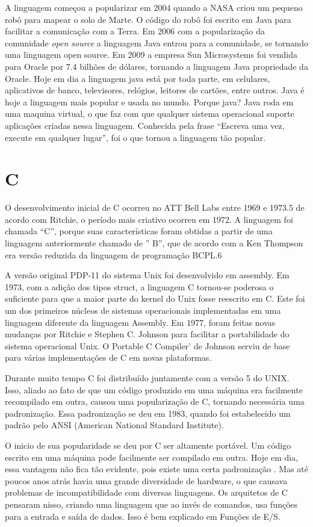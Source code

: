 \documentclass[
    12pt,               %
    openright,          %
    twoside,            %
    a4paper,            %
    brazil              %
    ]{abntex2}
\begin{document}
A linguagem começou a popularizar em 2004 quando a NASA criou um pequeno robô
para mapear o solo de Marte. O código do robô foi escrito em Java para
facilitar a comunicação com a Terra. Em 2006 com a popularização da comunidade
\textit{open source} a linguagem Java entrou para a comunidade, se tornando uma
linguagem open source.  Em 2009 a empresa Sun Microsystems foi vendida para
Oracle por 7.4 bilhões de dólares, tornando a linguagem Java propriedade da
Oracle. Hoje em dia a linguagem java está por toda parte, em celulares,
aplicativos de banco, televisores, relógios, leitores de cartões, entre outros.
Java é hoje a linguagem mais popular e usada no mundo.  Porque java?  Java roda
em uma maquina virtual, o que faz com que qualquer sistema operacional suporte
aplicações criadas nessa linguagem. Conhecida pela frase “Escreva uma vez,
execute em qualquer lugar”, foi o que tornou a linguagem tão popular.

\chapter{C}

O desenvolvimento inicial de C ocorreu no ATT Bell Labs entre 1969 e 1973.5 de 
acordo com Ritchie, o período mais criativo ocorreu em 1972. A linguagem foi chamada 
“C”, porque suas características foram obtidas a partir de uma linguagem anteriormente 
chamado de ” B”, que de acordo com a Ken Thompson era versão reduzida da linguagem de 
programação BCPL.6

A versão original PDP-11 do sistema Unix foi desenvolvido em assembly. Em 1973, com a 
adição dos tipos struct, a linguagem C tornou-se poderosa o suficiente para que a 
maior parte do kernel do Unix fosse reescrito em C. Este foi um dos primeiros núcleos 
de sistemas operacionais implementadas em uma linguagem diferente da linguagem Assembly. 
Em 1977, foram feitas novas mudanças por Ritchie e Stephen C. Johnson para facilitar a 
portabilidade do sistema operacional Unix. O Portable C Compiler’ de Johnson serviu de 
base para várias implementações de C em novas plataformas.

Durante muito tempo C foi distribuído juntamente com a versão 5 do UNIX. Isso, aliado ao 
fato de que um código produzido em uma máquina era facilmente recompilado em outra, causou 
uma popularização de C, tornando necessária uma padronização. Essa padronização se deu em 
1983, quando foi estabelecido um padrão pelo ANSI (American National Standard Institute).

O inicio de sua popularidade se deu por C ser altamente portável. Um código escrito em uma 
máquina pode facilmente ser compilado em outra. Hoje em dia, essa vantagem não fica tão 
evidente, pois existe uma certa padronização . Mas até poucos anos atrás havia uma grande 
diversidade de hardware, o que causava problemas de incompatibilidade com diversas linguagens. 
Os arquitetos de C pensaram nisso, criando uma linguagem que ao invés de comandos, usa funções 
para a entrada e saída de dados. Isso é bem explicado em Funções de E/S.
\end{document}
